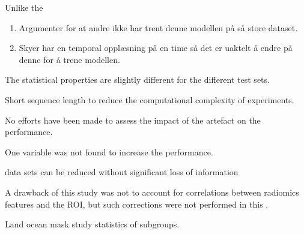 Unlike the \cite{}



\begin{enumerate}
    \item Argumenter for at andre ikke har trent denne modellen på så store dataset. 
    \item Skyer har en temporal opplæsning på en time så det er uaktelt å endre på denne for å trene modellen. 
\end{enumerate}


The statistical properties are slightly different for the different test sets.  

Short sequence length to reduce the computational complexity of experiments. 

No efforts have been made to assess the impact of the artefact on the performance.

One variable was not found to increase the performance.


data sets can be reduced without significant loss of information

A drawback of this study was not to account for correlations between radiomics features and the ROI, but such corrections were
not performed in this .

Land ocean mask study statistics of subgroups.